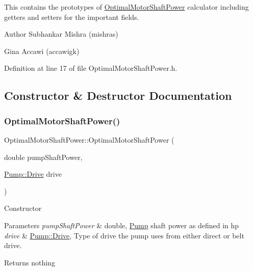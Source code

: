 This contains the prototypes of \hyperlink{class_optimal_motor_shaft_power}{Optimal\+Motor\+Shaft\+Power} calculator including getters and setters for the important fields.

\begin{DoxyAuthor}{Author}
Subhankar Mishra (mishras) 

Gina Accawi (accawigk) 
\end{DoxyAuthor}


Definition at line 17 of file Optimal\+Motor\+Shaft\+Power.\+h.



\subsection{Constructor \& Destructor Documentation}
\mbox{\label{class_optimal_motor_shaft_power_a5b793114a451ef9fe7a29f9db9f44bb6}} 
\subsubsection{\texorpdfstring{Optimal\+Motor\+Shaft\+Power()}{OptimalMotorShaftPower()}\hspace{0.1cm}{\footnotesize\ttfamily [1/3]}}
{\footnotesize\ttfamily Optimal\+Motor\+Shaft\+Power\+::\+Optimal\+Motor\+Shaft\+Power (\begin{DoxyParamCaption}\item[{double}]{pump\+Shaft\+Power,  }\item[{\hyperlink{class_pump_a32bf0ade131a11bb3b3fb374f638e983}{Pump\+::\+Drive}}]{drive }\end{DoxyParamCaption})\hspace{0.3cm}{\ttfamily [inline]}}

Constructor 
\begin{DoxyParams}{Parameters}
{\em pump\+Shaft\+Power} & double, \hyperlink{class_pump}{Pump} shaft power as defined in hp \\
\hline
{\em drive} & \hyperlink{class_pump_a32bf0ade131a11bb3b3fb374f638e983}{Pump\+::\+Drive}, Type of drive the pump uses from either direct or belt drive. \\
\hline
\end{DoxyParams}
\begin{DoxyReturn}{Returns}
nothing 
\end{DoxyReturn}


